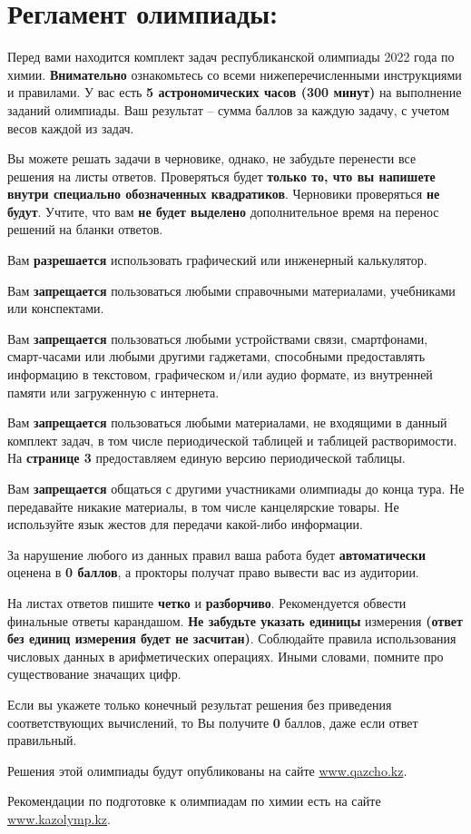 \section*{Регламент олимпиады:}

Перед вами находится комплект задач республиканской олимпиады 2022 года по химии. \textbf{Внимательно} ознакомьтесь со всеми нижеперечисленными инструкциями и правилами. У вас есть \textbf{5 астрономических часов (300 минут)} на выполнение заданий олимпиады. Ваш результат – сумма баллов за каждую задачу, с учетом весов каждой из задач.

Вы можете решать задачи в черновике, однако, не забудьте перенести все решения на листы ответов. Проверяться будет \textbf{только то, что вы напишете внутри специально обозначенных квадратиков}. Черновики проверяться \textbf{не будут}. Учтите, что вам \textbf{не будет выделено} дополнительное время на перенос решений на бланки ответов.

Вам \textbf{разрешается} использовать графический или инженерный калькулятор.

Вам \textbf{запрещается} пользоваться любыми справочными материалами, учебниками или конспектами.

Вам \textbf{запрещается} пользоваться любыми устройствами связи, смартфонами, смарт-часами или любыми другими гаджетами, способными предоставлять информацию в текстовом, графическом и/или аудио формате, из внутренней памяти или загруженную с интернета.

Вам \textbf{запрещается} пользоваться любыми материалами, не входящими в данный комплект задач, в том числе периодической таблицей и таблицей растворимости. На \textbf{странице 3} предоставляем единую версию периодической таблицы.

Вам \textbf{запрещается} общаться с другими участниками олимпиады до конца тура. Не передавайте никакие материалы, в том числе канцелярские товары. Не используйте язык жестов для передачи какой-либо информации.

За нарушение любого из данных правил ваша работа будет \textbf{автоматически} оценена в \textbf{0 баллов}, а прокторы получат право вывести вас из аудитории.

На листах ответов пишите \textbf{четко} и \textbf{разборчиво}. Рекомендуется обвести финальные ответы карандашом. \textbf{Не забудьте указать единицы} измерения \textbf{(ответ без единиц измерения будет не засчитан)}. Соблюдайте правила использования числовых данных в арифметических операциях. Иными словами, помните про существование значащих цифр.

Если вы укажете только конечный результат решения без приведения соответствующих вычислений, то Вы получите \textbf{0} баллов, даже если ответ правильный.

Решения этой олимпиады будут опубликованы на сайте \href{https://qazcho.kz}{www.qazcho.kz}.

Рекомендации по подготовке к олимпиадам по химии есть на сайте \href{https://kazolymp.kz}{www.kazolymp.kz}.
